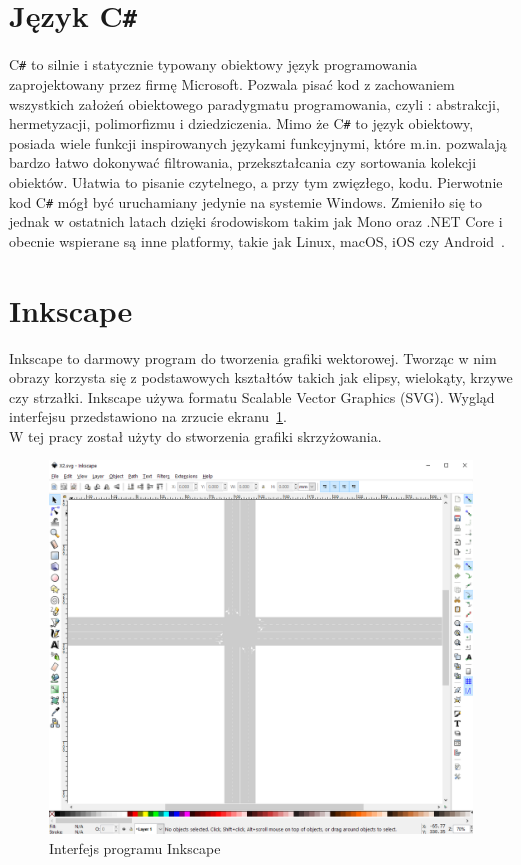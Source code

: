 \section*{Język C\texttt{\#}}
C\texttt{\#} to silnie i statycznie typowany obiektowy język programowania zaprojektowany przez firmę Microsoft. Pozwala pisać kod z zachowaniem wszystkich założeń obiektowego paradygmatu programowania, czyli : abstrakcji, hermetyzacji, polimorfizmu i dziedziczenia. Mimo że C\texttt{\#} to język obiektowy, posiada wiele funkcji inspirowanych językami funkcyjnymi, które m.in. pozwalają bardzo łatwo dokonywać filtrowania, przekształcania czy sortowania kolekcji obiektów. Ułatwia to pisanie czytelnego, a przy tym zwięzłego, kodu. Pierwotnie kod C\texttt{\#} mógł być uruchamiany jedynie na systemie Windows. Zmieniło się to jednak w ostatnich latach dzięki środowiskom takim jak Mono oraz .NET Core i obecnie wspierane są inne platformy, takie jak Linux, macOS, iOS czy Android~\cite{Albahari2017}.
\section*{Inkscape}
Inkscape to darmowy program do tworzenia grafiki wektorowej. Tworząc w nim obrazy korzysta się z podstawowych kształtów takich jak elipsy, wielokąty, krzywe czy strzałki. Inkscape używa formatu Scalable Vector Graphics (SVG). Wygląd interfejsu przedstawiono na zrzucie ekranu~\ref{fig:inkscape}. \\
W tej pracy został użyty do stworzenia grafiki skrzyżowania.
\begin{figure}[!h]
	\centering
	\includegraphics[width=1.0\linewidth]{inkscape}
	\caption[Interfejs programu Inkscape]{Interfejs programu Inkscape}
	\label{fig:inkscape}
\end{figure}
